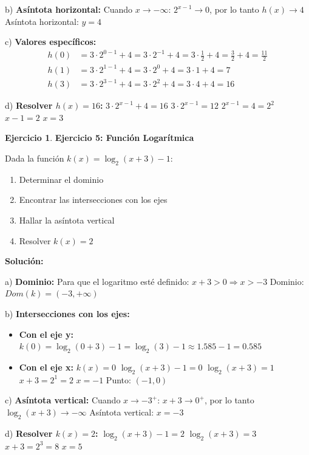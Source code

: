 \documentclass[12pt, a4paper, oneside]{book}
\theoremstyle{definition}
\newtheorem{ejercicio}{Ejercicio}[chapter]
\begin{document}
b) \textbf{Asíntota horizontal:}
Cuando $x \to -\infty$: $2^{x-1} \to 0$, por lo tanto $h(x) \to 4$
Asíntota horizontal: $y = 4$

c) \textbf{Valores específicos:}
\begin{align}
h(0) &= 3 \cdot 2^{0-1} + 4 = 3 \cdot 2^{-1} + 4 = 3 \cdot \frac{1}{2} + 4 = \frac{3}{2} + 4 = \frac{11}{2} \\
h(1) &= 3 \cdot 2^{1-1} + 4 = 3 \cdot 2^0 + 4 = 3 \cdot 1 + 4 = 7 \\
h(3) &= 3 \cdot 2^{3-1} + 4 = 3 \cdot 2^2 + 4 = 3 \cdot 4 + 4 = 16
\end{align}

d) \textbf{Resolver $h(x) = 16$:}
$3 \cdot 2^{x-1} + 4 = 16$
$3 \cdot 2^{x-1} = 12$
$2^{x-1} = 4 = 2^2$
$x - 1 = 2$
$x = 3$

\begin{ejercicio}
\textbf{Ejercicio 5: Función Logarítmica}

Dada la función $k(x) = \log_2(x + 3) - 1$:
\begin{enumerate}[label=\alph*)]
    \item Determinar el dominio
    \item Encontrar las intersecciones con los ejes
    \item Hallar la asíntota vertical
    \item Resolver $k(x) = 2$
\end{enumerate}
\end{ejercicio}

\textbf{Solución:}

a) \textbf{Dominio:}
Para que el logaritmo esté definido: $x + 3 > 0 \Rightarrow x > -3$
Dominio: $Dom(k) = (-3, +\infty)$

b) \textbf{Intersecciones con los ejes:}
\begin{itemize}
    \item \textbf{Con el eje y:} $k(0) = \log_2(0 + 3) - 1 = \log_2(3) - 1 \approx 1.585 - 1 = 0.585$
    \item \textbf{Con el eje x:} $k(x) = 0$
    $\log_2(x + 3) - 1 = 0$
    $\log_2(x + 3) = 1$
    $x + 3 = 2^1 = 2$
    $x = -1$
    Punto: $(-1, 0)$
\end{itemize}

c) \textbf{Asíntota vertical:}
Cuando $x \to -3^+$: $x + 3 \to 0^+$, por lo tanto $\log_2(x + 3) \to -\infty$
Asíntota vertical: $x = -3$

d) \textbf{Resolver $k(x) = 2$:}
$\log_2(x + 3) - 1 = 2$
$\log_2(x + 3) = 3$
$x + 3 = 2^3 = 8$
$x = 5$
\end{document}
